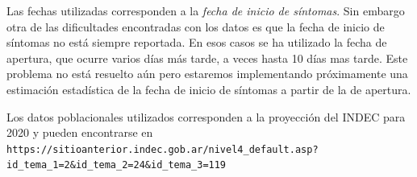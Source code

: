 \documentclass[12pt,a4paper]{article}
\begin{document}
Las fechas utilizadas corresponden a la \textit{fecha de inicio de síntomas}. Sin embargo otra de las dificultades encontradas con los datos es que la fecha de inicio de síntomas no está siempre reportada. En esos casos se ha utilizado la fecha de apertura, que ocurre varios días más tarde, a veces hasta 10 días mas tarde. Este problema no est\'a resuelto a\'un pero estaremos implementando pr\'oximamente una estimación estadística de la fecha de inicio de síntomas a partir de la de apertura.

Los datos poblacionales utilizados corresponden a la proyección del INDEC para 2020 y pueden encontrarse en \\

\verb|https://sitioanterior.indec.gob.ar/nivel4_default.asp?|\\
\verb|id_tema_1=2&id_tema_2=24&id_tema_3=119|
\end{document}

